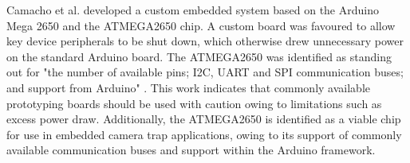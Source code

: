 \documentclass[class=report,11pt,crop=false]{standalone}
\begin{document}
Camacho et al. \cite{Camacho-DeploymentOf} developed a custom embedded system based on the Arduino Mega 2650 and the ATMEGA2650 chip. A custom board was favoured to allow key device peripherals to be shut down, which otherwise drew unnecessary power on the standard Arduino board. The ATMEGA2650 was identified as standing out for "the number of available pins; I2C, UART and SPI communication buses; and support from Arduino" \cite{Camacho-DeploymentOf}. This work indicates that commonly available prototyping boards should be used with caution owing to limitations such as excess power draw. Additionally, the ATMEGA2650 is identified as a viable chip for use in embedded camera trap applications, owing to its support of commonly available communication buses and support within the Arduino framework.






\ifstandalone

\printnoidxglossary[type=\acronymtype,nonumberlist]
\fi
\end{document}
